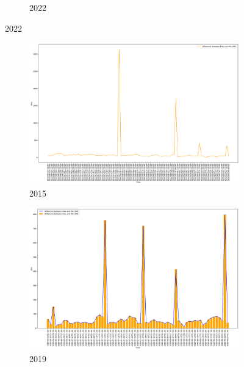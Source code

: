 \begin{figure}[h]
\begin{subfigure}{0.45\textwidth}
		\caption{2022}
	\end{subfigure}
	\label{fig:daily_ffmc_dif_maxmin}
\end{figure}

\begin{figure}[h]
	\centering
	\caption{Daily difference of max and min DMC values}
	\begin{subfigure}{0.45\textwidth}
		\centering
		\includegraphics[width=\textwidth]{graphs/2015/byHour/DMC_DIFFmaxMin.png}
		\caption{2015}
	\end{subfigure}
	\hfill
	\begin{subfigure}{0.45\textwidth}
		\centering
		\includegraphics[width=\textwidth]{graphs/2019/byHour/DMC_DIFFmaxMin.png}
		\caption{2019}
	\end{subfigure}
	\hfill
	\begin{subfigure}{0.45\textwidth}
		\centering

\end{subfigure}
\end{figure}
